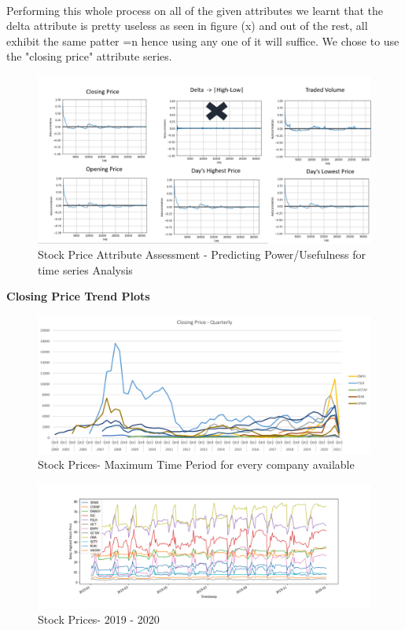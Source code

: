 \documentclass[sigconf, nonacm]{acmart}
\begin{document}
\\ Performing this whole process on all of the given attributes we learnt that the delta attribute is pretty useless as seen in figure (x) and out of the rest, all exhibit the same patter =n hence using any one of it will suffice. We chose to use the "closing price" attribute series. 
\begin{figure}[H]
  \centering
  \includegraphics[width=\linewidth]{images/autocorr.PNG}
  \caption{Stock Price Attribute Assessment - Predicting Power/Usefulness for time series Analysis}
\end{figure}



\textbf{Closing Price Trend Plots}
\begin{figure}[H]
  \centering
  \includegraphics[width=\linewidth]{images/allstocks.png}
  \caption{Stock Prices- Maximum Time Period for every company available}
\end{figure}

\begin{figure}[H]
  \centering
  \includegraphics[width=\linewidth]{images/stock_prices_all_2019t20.png}
  \caption{Stock Prices- 2019 - 2020}
\end{figure}
\end{document}
